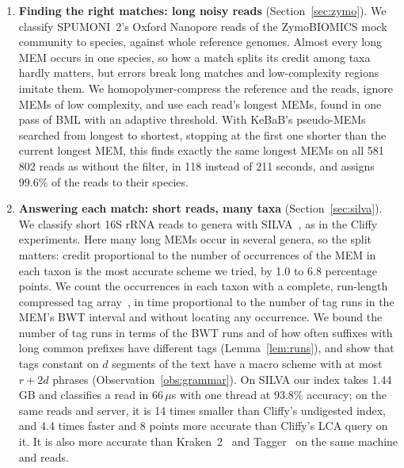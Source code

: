 \begin{enumerate}
\item \textbf{Finding the right matches: long noisy reads} (Section~\ref{sec:zymo}).
We classify SPUMONI~2's Oxford Nanopore reads of the ZymoBIOMICS mock community to species, against whole reference genomes.
Almost every long MEM occurs in one species, so how a match splits its credit among taxa hardly matters, but errors break long matches and low-complexity regions imitate them.
We homopolymer-compress the reference and the reads, ignore MEMs of low complexity, and use each read's longest MEMs, found in one pass of BML with an adaptive threshold.
With KeBaB's pseudo-MEMs~\cite{BrownEtAl2025KeBaB} searched from longest to shortest, stopping at the first one shorter than the current longest MEM, this finds exactly the same longest MEMs on all 581\,802 reads as without the filter, in 118 instead of 211 seconds, and assigns 99.6\% of the reads to their species.

\item \textbf{Answering each match: short reads, many taxa} (Section~\ref{sec:silva}).
We classify short 16S rRNA reads to genera with SILVA~\cite{QPY+13}, as in the Cliffy experiments.
Here many long MEMs occur in several genera, so the split matters: credit proportional to the number of occurrences of the MEM in each taxon is the most accurate scheme we tried, by 1.0 to 6.8 percentage points.
We count the occurrences in each taxon with a complete, run-length compressed tag array~\cite{BalazEtAl2024}, in time proportional to the number of tag runs in the MEM's BWT interval and without locating any occurrence.
We bound the number of tag runs in terms of the BWT runs and of how often suffixes with long common prefixes have different tags (Lemma~\ref{lem:runs}), and show that tags constant on $d$ segments of the text have a macro scheme with at most $r + 2d$ phrases (Observation~\ref{obs:grammar}).
On SILVA our index takes 1.44\,GB and classifies a read in 66\,$\mu$s with one thread at 93.8\% accuracy; on the same reads and server, it is 14 times smaller than Cliffy's undigested index, and 4.4 times faster and 8 points more accurate than Cliffy's LCA query on it.
It is also more accurate than Kraken~2~\cite{WLL19} and Tagger~\cite{DAF+25} on the same machine and reads.


\end{enumerate}
